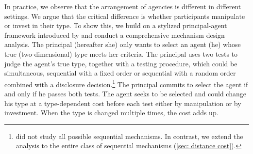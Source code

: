 
In practice, we observe that  the arrangement of agencies is different in different settings. We argue that the critical difference is whether participants manipulate or invest in their type. To show this, we build on a stylized principal-agent framework introduced by \citet{zigzag} and conduct a comprehensive mechanism design analysis. 
The principal (hereafter she) only wants to select an agent (he) whose true (two-dimensional) type meets her criteria.
The principal uses two tests to judge the agent's true type, together with a testing procedure, which could be simultaneous, sequential with a fixed order or sequential with a random order combined with a disclosure decision.\footnote{\citet{zigzag} did not study all possible sequential mechanisms. In contrast, we extend the analysis to the entire class of sequential mechanisms (\cref{sec: distance cost}).}
The principal commits to select the agent if and only if he passes both tests.
The agent seeks to be selected and could change his type at a type-dependent cost before each test either by manipulation or by investment. When the type is changed multiple times, the cost adds up.


